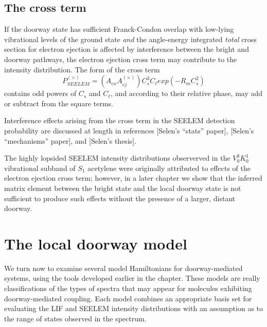 \documentclass[12pt]{mitthesis}
\begin{document}
\subsection{The cross term}

If the doorway state has sufficient Franck-Condon overlap with
low-lying vibrational levels of the ground state \emph{and} the
angle-energy integrated \emph{total} cross section for electron
ejection is affected by interference between the bright and doorway
pathways, the electron ejection cross term may contribute to the
intensity distribution. The form of the cross term
\begin{equation}
  P_{SEELEM}^{(\times)} = \left( A_{ex} A_{ej}^{(\times)} \right)
    C_s^3 C_\ell exp \left( -R_m C_s^2 \right)
\end{equation}
contains odd powers of $C_s$ and $C_{\ell}$, and according to their
relative phase, may add or subtract from the square terms.

Interference effects arising from the cross term in the SEELEM
detection probability are discussed at length in references [Selen's
``stats'' paper], [Selen's ``mechanisms'' paper], and [Selen's thesis].


The highly lopsided SEELEM intensity distributions observerved in the
$V^3_0K^1_0$ vibrational subband of $S_1$ acetylene were originally
attributed to effects of the electron ejection cross term; however, in
a later chapter we show that the inferred matrix element between the
bright state and the local doorway state is not sufficient to produce
such effects without the presence of a larger, distant doorway.


\section{The local doorway model}
\label{sec:model-local}

We turn now to examine several model Hamiltonians for doorway-mediated
systems, using the tools developed earlier in the chapter.  These
models are really classifications of the types of spectra that may
appear for molecules exhibiting doorway-mediated coupling.  Each model
combines an appropriate basis set for evaluating the LIF and SEELEM
intensity distributions with an assumption as to the range of states
observed in the spectrum.
\end{document}
